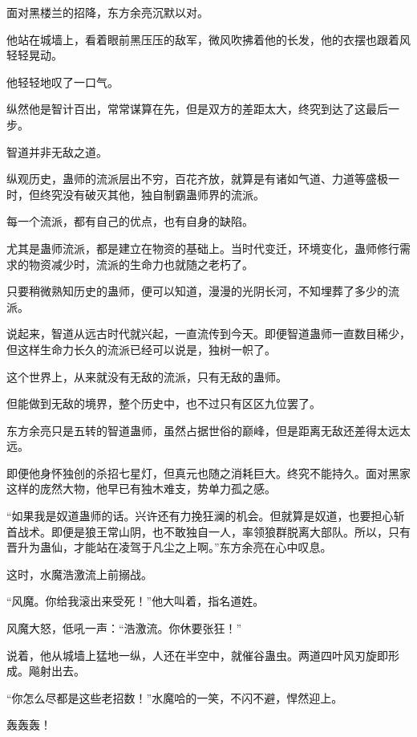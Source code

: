 
\begin{this_body}



面对黑楼兰的招降，东方余亮沉默以对。

他站在城墙上，看着眼前黑压压的敌军，微风吹拂着他的长发，他的衣摆也跟着风轻轻晃动。

他轻轻地叹了一口气。

纵然他是智计百出，常常谋算在先，但是双方的差距太大，终究到达了这最后一步。

智道并非无敌之道。

纵观历史，蛊师的流派层出不穷，百花齐放，就算是有诸如气道、力道等盛极一时，但终究没有破灭其他，独自制霸蛊师界的流派。

每一个流派，都有自己的优点，也有自身的缺陷。

尤其是蛊师流派，都是建立在物资的基础上。当时代变迁，环境变化，蛊师修行需求的物资减少时，流派的生命力也就随之老朽了。

只要稍微熟知历史的蛊师，便可以知道，漫漫的光阴长河，不知埋葬了多少的流派。

说起来，智道从远古时代就兴起，一直流传到今天。即便智道蛊师一直数目稀少，但这样生命力长久的流派已经可以说是，独树一帜了。

这个世界上，从来就没有无敌的流派，只有无敌的蛊师。

但能做到无敌的境界，整个历史中，也不过只有区区九位罢了。

东方余亮只是五转的智道蛊师，虽然占据世俗的巅峰，但是距离无敌还差得太远太远。

即便他身怀独创的杀招七星灯，但真元也随之消耗巨大。终究不能持久。面对黑家这样的庞然大物，他早已有独木难支，势单力孤之感。

“如果我是奴道蛊师的话。兴许还有力挽狂澜的机会。但就算是奴道，也要担心斩首战术。即便是狼王常山阴，也不敢独自一人，率领狼群脱离大部队。所以，只有晋升为蛊仙，才能站在凌驾于凡尘之上啊。”东方余亮在心中叹息。

这时，水魔浩激流上前搦战。

“风魔。你给我滚出来受死！”他大叫着，指名道姓。

风魔大怒，低吼一声：“浩激流。你休要张狂！”

说着，他从城墙上猛地一纵，人还在半空中，就催谷蛊虫。两道四叶风刃旋即形成。飚射出去。

“你怎么尽都是这些老招数！”水魔哈的一笑，不闪不避，悍然迎上。

轰轰轰！


\end{this_body}
